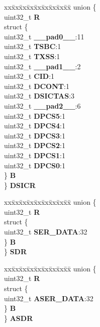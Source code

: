\begin{DoxyCompactItemize}
\begin{tabbing}
\end{tabbing}\item 
\mbox{\label{structDSPI__tag_a00d701d8cb9abe62783f205c435df647}} 
\begin{tabbing}
xx\=xx\=xx\=xx\=xx\=xx\=xx\=xx\=xx\=\kill
union \{\\
\>uint32\_t {\bfseries R}\\
\>struct \{\\
\>\>uint32\_t {\bfseries \_\_pad0\_\_}:11\\
\>\>uint32\_t {\bfseries TSBC}:1\\
\>\>uint32\_t {\bfseries TXSS}:1\\
\>\>uint32\_t {\bfseries \_\_pad1\_\_}:2\\
\>\>uint32\_t {\bfseries CID}:1\\
\>\>uint32\_t {\bfseries DCONT}:1\\
\>\>uint32\_t {\bfseries DSICTAS}:3\\
\>\>uint32\_t {\bfseries \_\_pad2\_\_}:6\\
\>\>uint32\_t {\bfseries DPCS5}:1\\
\>\>uint32\_t {\bfseries DPCS4}:1\\
\>\>uint32\_t {\bfseries DPCS3}:1\\
\>\>uint32\_t {\bfseries DPCS2}:1\\
\>\>uint32\_t {\bfseries DPCS1}:1\\
\>\>uint32\_t {\bfseries DPCS0}:1\\
\>\} {\bfseries B}\\
\} {\bfseries DSICR}\\

\end{tabbing}\item 
\mbox{\label{structDSPI__tag_aa257930015377944e02cd86efaab327d}} 
\begin{tabbing}
xx\=xx\=xx\=xx\=xx\=xx\=xx\=xx\=xx\=\kill
union \{\\
\>uint32\_t {\bfseries R}\\
\>struct \{\\
\>\>uint32\_t {\bfseries SER\_DATA}:32\\
\>\} {\bfseries B}\\
\} {\bfseries SDR}\\

\end{tabbing}\item 
\mbox{\label{structDSPI__tag_aaeede31e7769266dc403e3f61c23d8aa}} 
\begin{tabbing}
xx\=xx\=xx\=xx\=xx\=xx\=xx\=xx\=xx\=\kill
union \{\\
\>uint32\_t {\bfseries R}\\
\>struct \{\\
\>\>uint32\_t {\bfseries ASER\_DATA}:32\\
\>\} {\bfseries B}\\
\} {\bfseries ASDR}\\


\end{tabbing}
\end{DoxyCompactItemize}
